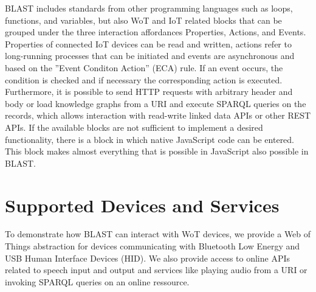 \documentclass[runningheads]{llncs}
\begin{document}
BLAST includes standards from other programming languages such as loops, functions, and variables, but also WoT and IoT related blocks that can be grouped under the three interaction affordances Properties, Actions, and Events.
Properties of connected IoT devices can be read and written, actions refer to long-running processes that can be initiated and events are asynchronous and based on the ''Event Conditon Action'' (ECA) rule.
If an event occurs, the condition is checked and if necessary the corresponding action is executed.
Furthermore, it is possible to send HTTP requests with arbitrary header and body or load knowledge graphs from a URI and execute SPARQL queries on the records, which allows interaction with read-write linked data APIs or other REST APIs.
If the available blocks are not sufficient to implement a desired functionality, there is a block in which native JavaScript code can be entered.
This block makes almost everything that is possible in JavaScript also possible in BLAST.

\section{Supported Devices and Services}

To demonstrate how BLAST can interact with WoT devices, we provide a Web of Things abstraction for devices communicating with Bluetooth Low Energy and USB Human Interface Devices (HID).
We also provide access to online APIs related to speech input and output and services like playing audio from a URI or invoking SPARQL queries on an online ressource.
\end{document}
